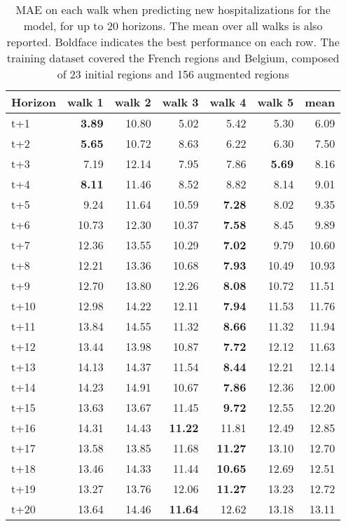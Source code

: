 \begin{table}[H]
\centering
\caption{MAE on each walk when predicting new hospitalizations for the model, for up to 20 horizons. The mean over all walks is also reported. Boldface indicates the best performance on each row. The training dataset covered the French regions and Belgium, composed of 23 initial regions and 156 augmented regions }
\label{tab:MAE_walk_dense_model}
\begin{tabular}{lrrrrrr}
\toprule
Horizon &  walk 1 &  walk 2 &  walk 3 &  walk 4 &  walk 5 &  mean \\
\midrule
t+1  & \textbf{3.89}  & 10.80  & 5.02  & 5.42  & 5.30  & 6.09  \\
t+2  & \textbf{5.65}  & 10.72  & 8.63  & 6.22  & 6.30  & 7.50  \\
t+3  & 7.19  & 12.14  & 7.95  & 7.86  & \textbf{5.69}  & 8.16  \\
t+4  & \textbf{8.11}  & 11.46  & 8.52  & 8.82  & 8.14  & 9.01  \\
t+5  & 9.24  & 11.64  & 10.59  & \textbf{7.28}  & 8.02  & 9.35  \\
t+6  & 10.73  & 12.30  & 10.37  & \textbf{7.58}  & 8.45  & 9.89  \\
t+7  & 12.36  & 13.55  & 10.29  & \textbf{7.02}  & 9.79  & 10.60  \\
t+8  & 12.21  & 13.36  & 10.68  & \textbf{7.93}  & 10.49  & 10.93  \\
t+9  & 12.70  & 13.80  & 12.26  & \textbf{8.08}  & 10.72  & 11.51  \\
t+10  & 12.98  & 14.22  & 12.11  & \textbf{7.94}  & 11.53  & 11.76  \\
t+11  & 13.84  & 14.55  & 11.32  & \textbf{8.66}  & 11.32  & 11.94  \\
t+12  & 13.44  & 13.98  & 10.87  & \textbf{7.72}  & 12.12  & 11.63  \\
t+13  & 14.13  & 14.37  & 11.54  & \textbf{8.44}  & 12.21  & 12.14  \\
t+14  & 14.23  & 14.91  & 10.67  & \textbf{7.86}  & 12.36  & 12.00  \\
t+15  & 13.63  & 13.67  & 11.45  & \textbf{9.72}  & 12.55  & 12.20  \\
t+16  & 14.31  & 14.43  & \textbf{11.22}  & 11.81  & 12.49  & 12.85  \\
t+17  & 13.58  & 13.85  & 11.68  & \textbf{11.27}  & 13.10  & 12.70  \\
t+18  & 13.46  & 14.33  & 11.44  & \textbf{10.65}  & 12.69  & 12.51  \\
t+19  & 13.27  & 13.76  & 12.06  & \textbf{11.27}  & 13.23  & 12.72  \\
t+20  & 13.64  & 14.46  & \textbf{11.64}  & 12.62  & 13.18  & 13.11  \\

\bottomrule
\end{tabular}
\end{table}
